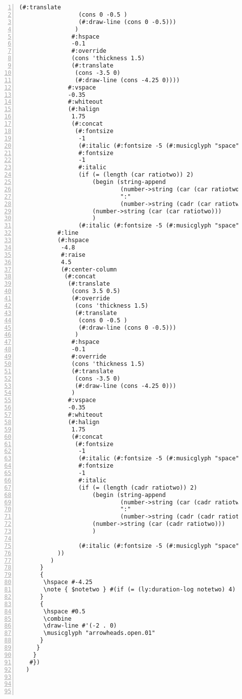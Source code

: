 \begin{Verbatim}[numbers=left,xleftmargin=5mm]
                (#:translate
                 (cons 0 -0.5 )
                 (#:draw-line (cons 0 -0.5)))
                )
               #:hspace
               -0.1
               #:override
               (cons 'thickness 1.5)
               (#:translate
                (cons -3.5 0)
                (#:draw-line (cons -4.25 0))))
              #:vspace
              -0.35
              #:whiteout
              (#:halign
               1.75
               (#:concat
                (#:fontsize
                 -1
                 (#:italic (#:fontsize -5 (#:musicglyph "space")))
                 #:fontsize
                 -1
                 #:italic
                 (if (= (length (car ratiotwo)) 2)
                     (begin (string-append
                             (number->string (car (car ratiotwo)))
                             ":"
                             (number->string (cadr (car ratiotwo))))  )
                     (number->string (car (car ratiotwo)))
                     )
                 (#:italic (#:fontsize -5 (#:musicglyph "space")))))))))
           #:line
           (#:hspace
            -4.8
            #:raise
            4.5
            (#:center-column
             (#:concat
              (#:translate
               (cons 3.5 0.5)
               (#:override
                (cons 'thickness 1.5)
                (#:translate
                 (cons 0 -0.5 )
                 (#:draw-line (cons 0 -0.5)))
                )
               #:hspace
               -0.1
               #:override
               (cons 'thickness 1.5)
               (#:translate
                (cons -3.5 0)
                (#:draw-line (cons -4.25 0)))
               )
              #:vspace
              -0.35
              #:whiteout
              (#:halign
               1.75
               (#:concat
                (#:fontsize
                 -1
                 (#:italic (#:fontsize -5 (#:musicglyph "space")))
                 #:fontsize
                 -1
                 #:italic
                 (if (= (length (cadr ratiotwo)) 2)
                     (begin (string-append
                             (number->string (car (cadr ratiotwo)))
                             ":"
                             (number->string (cadr (cadr ratiotwo)))))
                     (number->string (car (cadr ratiotwo)))
                     )

                 (#:italic (#:fontsize -5 (#:musicglyph "space")))))))))
           ))
         )
      }
      {
       \hspace #-4.25
       \note { $notetwo } #(if (= (ly:duration-log notetwo) 4) 1 1 )
      }
      {
       \hspace #0.5
       \combine
       \draw-line #'(-2 . 0)
       \musicglyph "arrowheads.open.01"
      }
     }
    }
   #})
  )




\end{Verbatim}
